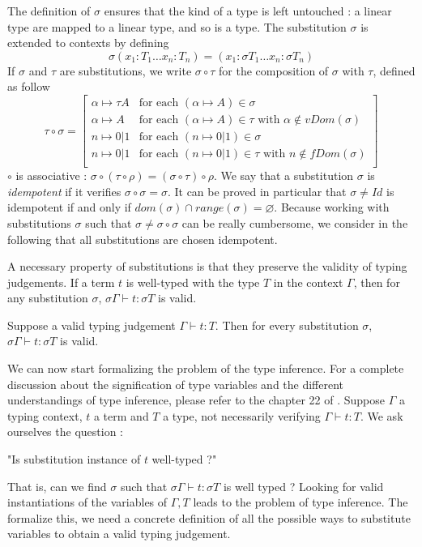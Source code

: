 \begin{defn}
 	The definition of $\sigma$ ensures that the kind of a type is left untouched : a linear type are mapped to a linear type, and so is a
 	type. The substitution $\sigma$ is extended to contexts by defining 
 		$$\sigma (x_1 : T_1 \dots x_n : T_n) = (x_1 : \sigma T_1 \dots x_n : \sigma T_n)$$
	If $\sigma$ and $\tau$ are substitutions, we write $\sigma \circ \tau$ for the composition of $\sigma$ with $\tau$, defined as follow
		$$\tau \circ \sigma = \left[ \begin{array}{ll}
																			\alpha \mapsto \tau A & \text{for each } (\alpha \mapsto A) \in \sigma \\
																			\alpha \mapsto A & \text{for each } (\alpha \mapsto A) \in \tau \text{ with } \alpha \notin vDom(\sigma) \\
																			n \mapsto 0|1 & \text{for each } (n \mapsto 0|1) \in \sigma \\
																			n \mapsto 0|1 & \text{for each } (n \mapsto 0|1) \in \tau \text{ with } n \notin fDom(\sigma) \\
																		\end{array} \right]$$
 	$\circ$ is associative : $\sigma \circ (\tau \circ \rho) = (\sigma \circ \tau) \circ \rho$. We say that a substitution $\sigma$ is
 	\textit{idempotent} if it verifies $\sigma \circ \sigma = \sigma$. It can be proved in particular that $\sigma \neq Id$ is idempotent if and
 	only if $dom(\sigma) \cap range(\sigma) = \varnothing$. Because working with substitutions $\sigma$ such that
 	$\sigma \neq \sigma \circ \sigma$ can be really cumbersome, we consider in the following that all substitutions are chosen idempotent.
\end{defn}

A necessary property of substitutions is that they preserve the validity of typing judgements. If a term $t$ is well-typed with the
type $T$ in the context $\Gamma$, then for any substitution $\sigma$, $\sigma \Gamma \vdash t : \sigma T$ is valid.

\begin{thm}
	\label{subs-judgement}
	Suppose a valid typing judgement $\Gamma \vdash t : T$. Then for every substitution $\sigma$, $\sigma \Gamma \vdash t : \sigma T$
	is valid.
\end{thm}

We can now start formalizing the problem of the type inference. For a complete discussion about the signification of type variables
and the different understandings of type inference, please refer to the chapter 22 of \cite{pierce02}.
Suppose $\Gamma$ a typing context, $t$ a term and $T$ a type, not necessarily verifying $\Gamma \vdash t : T$. We ask ourselves the
question :
 \begin{center}
 	 "Is  substitution instance of $t$ well-typed ?"
 \end{center}
That is, can we find $\sigma$ such that $\sigma \Gamma \vdash t : \sigma T$ is well typed ? Looking for valid instantiations of the
variables of $\Gamma, T$ leads to the problem of type inference. The formalize this, we need a concrete definition of all the
possible ways to substitute variables to obtain a valid typing judgement.

